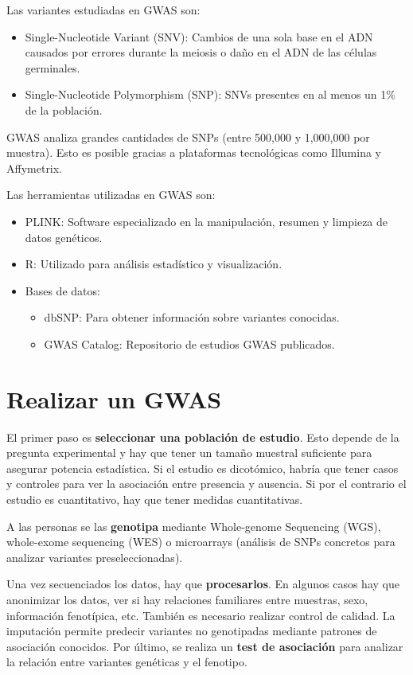 Las variantes estudiadas en GWAS son:
\begin{itemize}
\item Single-Nucleotide Variant (SNV): Cambios de una sola base en el ADN causados por errores durante la meiosis o daño en el ADN de las células germinales.
\item Single-Nucleotide Polymorphism (SNP): SNVs presentes en al menos un 1\% de la población.
\end{itemize}

GWAS analiza grandes cantidades de SNPs (entre 500,000 y 1,000,000 por muestra). Esto es posible gracias a plataformas tecnológicas como Illumina y Affymetrix.

Las herramientas utilizadas en GWAS son:
\begin{itemize}
\item PLINK: Software especializado en la manipulación, resumen y limpieza de datos genéticos.
\item R: Utilizado para análisis estadístico y visualización.
\item Bases de datos:
\begin{itemize}
\item dbSNP: Para obtener información sobre variantes conocidas.
\item GWAS Catalog: Repositorio de estudios GWAS publicados.
\end{itemize}
\end{itemize}

\section{Realizar un GWAS}
El primer paso es \textbf{seleccionar una población de estudio}. Esto depende de la pregunta experimental y hay que tener un tamaño muestral suficiente para asegurar potencia estadística. Si el estudio es dicotómico, habría que tener casos y controles para ver la asociación entre presencia y ausencia. Si por el contrario el estudio es cuantitativo, hay que tener medidas cuantitativas. 

A las personas se las \textbf{genotipa} mediante Whole-genome Sequencing (WGS), whole-exome sequencing (WES) o microarrays (análisis de SNPs concretos para analizar variantes preseleccionadas). 

Una vez secuenciados los datos, hay que \textbf{procesarlos}. En algunos casos hay que anonimizar los datos, ver si hay relaciones familiares entre muestras, sexo, información fenotípica, etc. También es necesario realizar control de calidad. La imputación permite predecir variantes no genotipadas mediante patrones de asociación conocidos. Por último, se realiza un \textbf{test de asociación} para analizar la relación entre variantes genéticas y el fenotipo.


